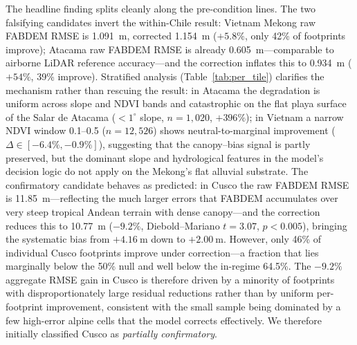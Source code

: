 \documentclass[preprint,authoryear,number]{elsarticle}
\begin{document}
The headline finding splits cleanly along the pre-condition lines. The two falsifying candidates invert the within-Chile result: Vietnam Mekong raw FABDEM RMSE is \SI{1.091}{\meter}, corrected \SI{1.154}{\meter} ($+5.8\%$, only 42\% of footprints improve); Atacama raw FABDEM RMSE is already \SI{0.605}{\meter}---comparable to airborne LiDAR reference accuracy---and the correction inflates this to \SI{0.934}{\meter} ($+54\%$, 39\% improve). Stratified analysis (Table~\ref{tab:per_tile}) clarifies the mechanism rather than rescuing the result: in Atacama the degradation is uniform across slope and NDVI bands and catastrophic on the flat playa surface of the Salar de Atacama ($<1^{\circ}$ slope, $n = 1{,}020$, $+396\%$); in Vietnam a narrow NDVI window 0.1--0.5 ($n = 12{,}526$) shows neutral-to-marginal improvement ($\Delta \in [-6.4\%, -0.9\%]$), suggesting that the canopy--bias signal is partly preserved, but the dominant slope and hydrological features in the model's decision logic do not apply on the Mekong's flat alluvial substrate. The confirmatory candidate behaves as predicted: in Cusco the raw FABDEM RMSE is \SI{11.85}{\meter}---reflecting the much larger errors that FABDEM accumulates over very steep tropical Andean terrain with dense canopy---and the correction reduces this to \SI{10.77}{\meter} ($-9.2\%$, Diebold--Mariano $t = 3.07$, $p < 0.005$), bringing the systematic bias from $+\SI{4.16}{\meter}$ down to $+\SI{2.00}{\meter}$. However, only 46\% of individual Cusco footprints improve under correction---a fraction that lies marginally below the 50\% null and well below the in-regime 64.5\%. The $-9.2\%$ aggregate RMSE gain in Cusco is therefore driven by a minority of footprints with disproportionately large residual reductions rather than by uniform per-footprint improvement, consistent with the small sample being dominated by a few high-error alpine cells that the model corrects effectively. We therefore initially classified Cusco as \emph{partially confirmatory}.
\end{document}
